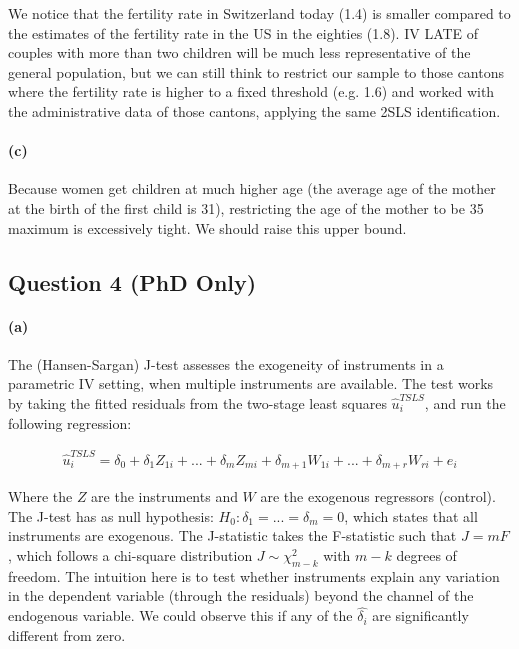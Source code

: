 \documentclass{scrartcl}
\begin{document}
We notice that the fertility rate in Switzerland today (1.4) is smaller compared to the estimates of the fertility rate in the US in the eighties (1.8). IV LATE of couples with more than two children will be much less representative of the general population, but we can still think to restrict our sample to those cantons where the fertility rate is higher to a fixed threshold (e.g. 1.6) and worked with the administrative data of those cantons, applying the same 2SLS identification.

\paragraph*{(c)}

Because women get children at much higher age (the average age of the mother at the birth of the first child is 31), restricting the age of the mother to be 35 maximum is excessively tight. We should raise this upper bound.

\subsection*{Question 4 (PhD Only)}

\paragraph*{(a)}

The (Hansen-Sargan) J-test assesses the exogeneity of instruments in a parametric IV setting, when multiple instruments are available. The test works by taking the fitted residuals from the two-stage least squares $\hat{u}^{TSLS}_{i}$, and run the following regression: 

\begin{align}
    \hat{u}^{TSLS}_{i} = \delta_0 + \delta_1Z_{1i} + ...+\delta_mZ_{mi} + \delta_{m+1}W_{1i}  +...+ \delta_{m+r}W_{ri} + e_i
\end{align}

Where the $Z$ are the instruments and $W$ are the exogenous regressors (control). The J-test has as null hypothesis: $H_0:\delta_1=...=\delta_m=0$, which states that all instruments are exogenous. The J-statistic takes the F-statistic such that $J=mF$, which follows a chi-square distribution $J\sim \chi^{2}_{m-k}$ with $m-k$ degrees of freedom. The intuition here is to test whether instruments explain any variation in the dependent variable (through the residuals) beyond the channel of the endogenous variable. We could observe this if any of the $\hat{\delta_i}$ are significantly different from zero.
\end{document}
